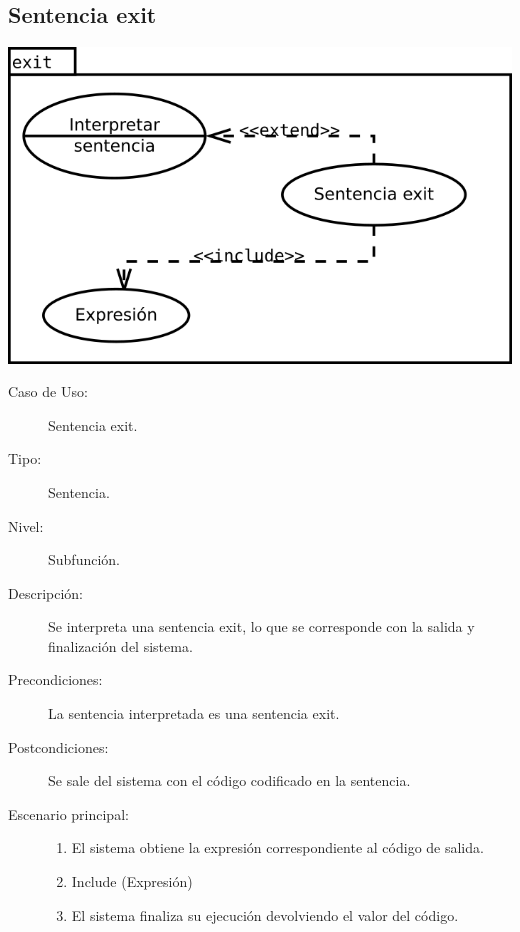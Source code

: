 
\subsection {Sentencia exit}
\begin{center}
\includegraphics[scale=0.4]{exit.png} \\
\end{center}
\begin{framed}
\FloatBarrier
\begin{description}
   \item[Caso de Uso:]  Sentencia exit.
   \item [Tipo:] Sentencia.
   \item[Nivel:]  Subfunción.
   \item[Descripción:] 
   Se interpreta una sentencia exit, lo que 
   se corresponde con la salida y finalización del sistema. 
   \item[Precondiciones:] 
   La sentencia interpretada es una sentencia exit.
   \item[Postcondiciones:] Se sale del sistema con el código codificado
   en la sentencia.
   \item[Escenario principal:] \hfill
   \begin{enumerate}
   \item El sistema obtiene la expresión correspondiente al código de salida.
   \item Include (Expresión)
   \item El sistema finaliza su ejecución devolviendo el valor del código.
   \end{enumerate}
\end{description}
 \FloatBarrier
\end{framed}

